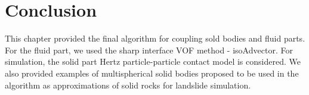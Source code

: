 \section{Conclusion}
This chapter provided the final algorithm for coupling sold bodies and fluid parts. For the fluid part, we used the sharp interface VOF method - isoAdvector\cite{roenby2019isoadvector}. For simulation, the solid part Hertz particle-particle contact model is considered. We also provided examples of multispherical solid bodies proposed to be used in the algorithm as approximations of solid rocks for landslide simulation.
